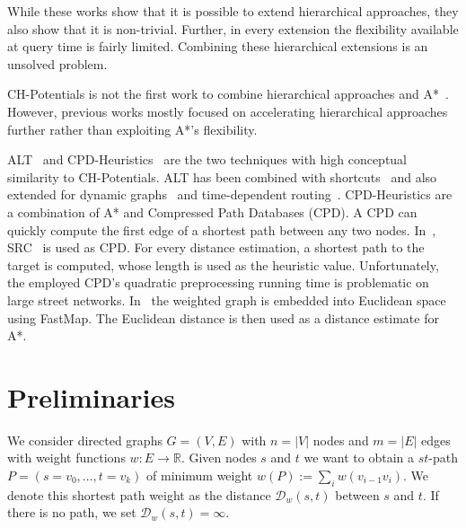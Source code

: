 \documentclass[manuscript,review]{acmart}
\newcommand*{\dist}{\mathcal{D}}
\begin{document}
While these works show that it is possible to extend hierarchical approaches, they also show that it is non-trivial.
Further, in every extension the flexibility available at query time is fairly limited.
Combining these hierarchical extensions is an unsolved problem.

CH-Potentials is not the first work to combine hierarchical approaches and A*~\cite{bdsssw-chgds-10,gkw-blwr-07,bdgwz-sfpcs-19}.
However, previous works mostly focused on accelerating hierarchical approaches further rather than exploiting A*'s flexibility.

ALT~\cite{gh-cspas-05,gw-cppsp-05} and CPD-Heuristics~\cite{DBLP:conf/ijcai/BonoGHS19} are the two techniques with high conceptual similarity to CH-Potentials.
ALT has been combined with shortcuts~\cite{bdsssw-chgds-10} and also extended for dynamic graphs~\cite{dw-lbrdg-07} and time-dependent routing~\cite{ndls-bastd-12,dn-crdtd-12}.
%
CPD-Heuristics are a combination of A* and Compressed Path Databases (CPD).
A CPD can quickly compute the first edge of a shortest path between any two nodes.
In~\cite{DBLP:conf/ijcai/BonoGHS19}, SRC~\cite{DBLP:conf/socs/StrasserHB14} is used as CPD.
For every distance estimation, a shortest path to the target is computed, whose length is used as the heuristic value.
Unfortunately, the employed CPD's quadratic preprocessing running time is problematic on large street networks.
%
%
In~\cite{DBLP:conf/ijcai/0002UJAKK18} the weighted graph is embedded into Euclidean space using FastMap. %
The Euclidean distance is then used as a distance estimate for A*.

\section{Preliminaries}\label{sec:preliminaries}

We consider directed graphs $G=(V,E)$ with $n=|V|$ nodes and $m=|E|$ edges with weight functions $w : E \to \mathbb{R}$.
Given nodes $s$ and $t$ we want to obtain a $st$-path $P=(s=v_0,\dots,t=v_k)$ of minimum weight $w(P) := \sum_{i} w(v_{i-1}v_i)$.
We denote this shortest path weight as the distance $\dist_w(s,t)$ between $s$ and $t$.
If there is no path, we set $\dist_w(s,t)=\infty$.
\end{document}
